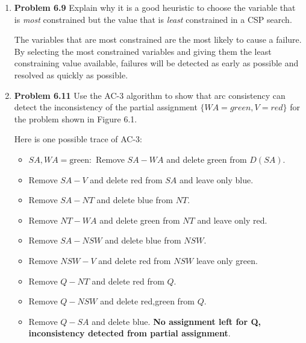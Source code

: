 \documentclass[10pt]{article}
\begin{document}
\begin{enumerate}
\item \textbf{Problem 6.9} Explain why it is a good heuristic to choose the variable that is \textit{most} constrained but the value that is \textit{least} constrained in a CSP search.
  \begin{center}
    The variables that are most constrained are the most likely to cause a failure. By selecting the most constrained variables and giving them the least constraining value available, failures will be detected as early as possible and resolved as quickly as possible.
  \end{center}

\item \textbf{Problem 6.11} Use the AC-3 algorithm to show that arc consistency can detect the inconsistency of the partial assignment $\{WA = \textit{green}, V = \textit{red}\}$ for the problem shown in Figure 6.1.
  \begin{center}
    Here is one possible trace of AC-3:
    \begin{itemize}
    \item $SA, WA=\textrm{green}:$ Remove $SA-WA$ and delete green from $D(SA)$.
    \item Remove $SA - V$ and delete red from $SA$ and leave only blue.
    \item Remove $SA-NT$ and delete blue from $NT$.
    \item Remove $NT-WA$ and delete green from $NT$ and leave only red.
    \item Remove $SA-NSW$ and delete blue from $NSW$.
    \item Remove $NSW-V$ and delete red from $NSW$ leave only green.
    \item Remove $Q-NT$ and delete red from $Q$.
    \item Remove $Q-NSW$ and delete red,green from $Q$.
    \item Remove $Q-SA$ and delete blue. \textbf{No assignment left for Q, inconsistency detected from partial assignment}.
    \end{itemize}
  \end{center}


\end{enumerate}
\end{document}
